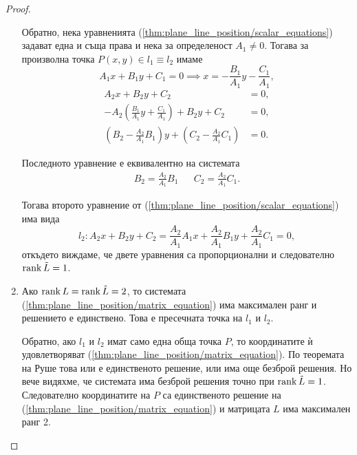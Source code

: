 \documentclass[
  numbers=endperiod,
  headings=standardclasses,
  bibliography=totocnumbered,
]{scrartcl}
\begin{document}
\begin{proof}
\begin{enumerate}
    Обратно, нека уравненията (\eqref{thm:plane_line_position/scalar_equations}) задават една и съща права и нека за определеност \( A_1 \neq 0 \). Тогава за произволна точка \( P(x, y) \in l_1 \equiv l_2 \) имаме
    \begin{equation*}
      A_1x + B_1y + C_1 = 0
      \implies
      x = - \frac {B_1} {A_1} y - \frac {C_1} {A_1},
    \end{equation*}
    \begin{align*}
      A_2x + B_2y + C_2 &= 0,
      \\
      - A_2 \left(\frac {B_1} {A_1} y + \frac {C_1} {A_1} \right) + B_2y + C_2 &= 0,
      \\
      \left(B_2 - \frac {A_2} {A_1} B_1 \right) y + \left(C_2 - \frac {A_2} {A_1} C_1 \right) &= 0.
    \end{align*}

    Последното уравнение е еквивалентно на системата
    \begin{align*}
      B_2 = \frac {A_2} {A_1} B_1
      &&
      C_2 = \frac {A_2} {A_1} C_1.
    \end{align*}

    Тогава второто уравнение от (\eqref{thm:plane_line_position/scalar_equations}) има вида
    \begin{equation*}
      l_2:
      A_2 x + B_2 y + C_2 =
      \frac {A_2} {A_1} A_1 x + \frac {A_2} {A_1} B_1 y + \frac {A_2} {A_1} C_1
      = 0,
    \end{equation*}
    откъдето виждаме, че двете уравнения са пропорционални и следователно \( \operatorname{rank} \tilde L = 1 \).

    \item Ако \( \operatorname{rank} L = \operatorname{rank} \tilde L = 2 \), то системата (\eqref{thm:plane_line_position/matrix_equation}) има максимален ранг и решението е единствено. Това е пресечната точка на \( l_1 \) и \( l_2 \).

    Обратно, ако \( l_1 \) и \( l_2 \) имат само една обща точка \( P \), то координатите ѝ удовлетворяват (\eqref{thm:plane_line_position/matrix_equation}). По теоремата на Руше това или е единственото решение, или има още безброй решения. Но вече видяхме, че системата има безброй решения точно при \( \operatorname{rank} \tilde L = 1 \). Следователно координатите на \( P \) са единственото решение на (\eqref{thm:plane_line_position/matrix_equation}) и матрицата \( L \) има максимален ранг 2.
  \end{enumerate}
\end{proof}
\end{document}

